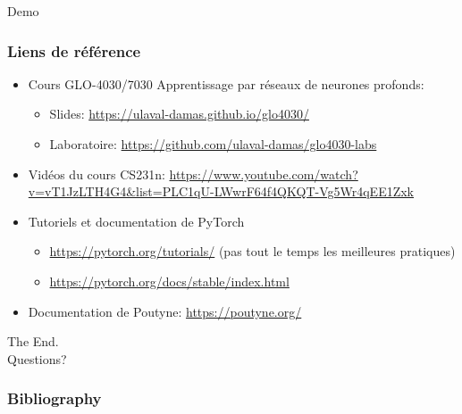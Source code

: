 \documentclass[english,usenames,dvipsnames]{beamer}
\begin{document}
\begin{frame}[nonum]
	\begin{center}
		{\Huge Demo}
	\end{center}
\end{frame}

\begin{frame}
	\frametitle{Liens de référence}
	\begin{itemize}
		\item Cours GLO-4030/7030 Apprentissage par réseaux de neurones profonds:
		\begin{itemize}
			\item Slides: \url{https://ulaval-damas.github.io/glo4030/}
			\item Laboratoire: \url{https://github.com/ulaval-damas/glo4030-labs}
		\end{itemize}
		\item Vidéos du cours CS231n: \url{https://www.youtube.com/watch?v=vT1JzLTH4G4&list=PLC1qU-LWwrF64f4QKQT-Vg5Wr4qEE1Zxk}
		\item Tutoriels et documentation de PyTorch
		\begin{itemize}
			\item \url{https://pytorch.org/tutorials/} (pas tout le temps les meilleures pratiques)
			\item \url{https://pytorch.org/docs/stable/index.html}
		\end{itemize}
		\item Documentation de Poutyne: \url{https://poutyne.org/}
	\end{itemize}

\end{frame}

\begin{frame}[nonum]
	\begin{center}
		{\Huge The End.\\[2cm] Questions?}
	\end{center}
\end{frame}

\begin{frame}
	\frametitle{Bibliography}
    \printbibliography
\end{frame}

\appendix
\end{document}
